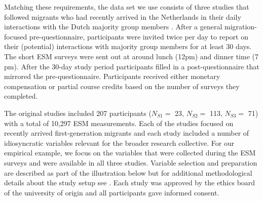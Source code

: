 Matching these requirements, the data set we use consists of three
studies that followed migrants who had recently arrived in the
Netherlands in their daily interactions with the Dutch majority group
members \citep[for the data set see][]{Kreienkamp2022b}. After a general
migration-focused pre-questionnaire, participants were invited twice per
day to report on their (potential) interactions with majority group
members for at least 30 days. The short ESM surveys were sent out at
around lunch (12pm) and dinner time (7 pm). After the 30-day study
period participants filled in a post-questionnaire that mirrored the
pre-questionnaire. Participants received either monetary compensation or
partial course credits based on the number of surveys they completed.

The original studies included 207 participants (\(N_{S1}=\) 23,
\(N_{S2}=\) 113, \(N_{S3}=\) 71) with a total of 10,297 ESM
measurements. Each of the studies focused on recently arrived
first-generation migrants and each study included a number of
idiosyncratic variables relevant for the broader research collective.
For our empirical example, we focus on the variables that were collected
during the ESM surveys and were available in all three studies. Variable
selection and preparation are described as part of the illustration
below but for additional methodological details about the study setup
see \citet[][]{Kreienkamp2022b}. Each study was approved by the ethics
board of the university of origin and all participants gave informed
consent.

